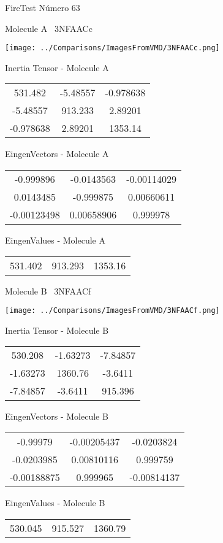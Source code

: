\vtab[-3cm]
\begin{center}
{\large FireTest \tab Número 63}
\end{center}
\begin{multicols}{2}
\begin{center}

Molecule A \
3NFAACc

\texttt{[image: ../Comparisons/ImagesFromVMD/3NFAACc.png]}

Inertia Tensor - Molecule A \\
\begin{tabular}{|c c c|}
531.482	 & 	-5.48557	 & 	-0.978638	 \\
-5.48557	 & 	913.233	 & 	2.89201	 \\
-0.978638	 & 	2.89201	 & 	1353.14
\end{tabular}

\vtab
 EingenVectors - Molecule A     \\
\begin{tabular}{|c c c|}
-0.999896	 & 	-0.0143563	 & 	-0.00114029	 \\
0.0143485	 & 	-0.999875	 & 	0.00660611	 \\
-0.00123498	 & 	0.00658906	 & 	0.999978
\end{tabular}

\vtab
 EingenValues - Molecule A     \\
\begin{tabular}{|c c c|}
531.402	 & 	913.293	 & 	1353.16	 \\
\end{tabular}
\columnbreak

Molecule B \
3NFAACf

\texttt{[image: ../Comparisons/ImagesFromVMD/3NFAACf.png]}

Inertia Tensor - Molecule B \\
\begin{tabular}{|c c c|}
530.208	 & 	-1.63273	 & 	-7.84857	 \\
-1.63273	 & 	1360.76	 & 	-3.6411	 \\
-7.84857	 & 	-3.6411	 & 	915.396
\end{tabular}

\vtab
 EingenVectors - Molecule B     \\
\begin{tabular}{|c c c|}
-0.99979	 & 	-0.00205437	 & 	-0.0203824	 \\
-0.0203985	 & 	0.00810116	 & 	0.999759	 \\
-0.00188875	 & 	0.999965	 & 	-0.00814137
\end{tabular}

\vtab
 EingenValues - Molecule B     \\
\begin{tabular}{|c c c|}
530.045	 & 	915.527	 & 	1360.79	 \\
\end{tabular}

\end{center}
\end{multicols}

